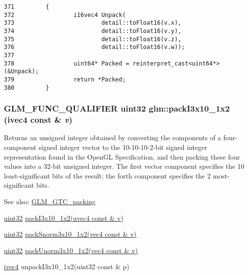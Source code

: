 \begin{Code}\begin{verbatim}371         {
372                 i16vec4 Unpack(
373                         detail::toFloat16(v.x),
374                         detail::toFloat16(v.y),
375                         detail::toFloat16(v.z),
376                         detail::toFloat16(v.w));
377 
378                 uint64* Packed = reinterpret_cast<uint64*>(&Unpack);
379                 return *Packed;
380         }
\end{verbatim}
\end{Code}


\hypertarget{group__gtc__packing_g032e18fa5bc5b8f3897104aeb2f1e195}{
\subsubsection[packI3x10\_\-1x2]{\setlength{\rightskip}{0pt plus 5cm}GLM\_\-FUNC\_\-QUALIFIER uint32 glm::packI3x10\_\-1x2 (ivec4 const \& {\em v})}}
\label{group__gtc__packing_g032e18fa5bc5b8f3897104aeb2f1e195}


Returns an unsigned integer obtained by converting the components of a four-component signed integer vector to the 10-10-10-2-bit signed integer representation found in the OpenGL Specification, and then packing these four values into a 32-bit unsigned integer. The first vector component specifies the 10 least-significant bits of the result; the forth component specifies the 2 most-significant bits.

\begin{Desc}
\item[See also:]\hyperlink{group__gtc__packing}{GLM\_\-GTC\_\-packing} 

\hyperlink{group__gtc__type__precision_g202b6a53c105fcb7e531f9b443518451}{uint32} \hyperlink{group__gtc__packing_g032e18fa5bc5b8f3897104aeb2f1e195}{packI3x10\_\-1x2(uvec4 const \& v)} 

\hyperlink{group__gtc__type__precision_g202b6a53c105fcb7e531f9b443518451}{uint32} \hyperlink{group__gtc__packing_g0d4157cec37c0312216a7be1cc92df54}{packSnorm3x10\_\-1x2(vec4 const \& v)} 

\hyperlink{group__gtc__type__precision_g202b6a53c105fcb7e531f9b443518451}{uint32} \hyperlink{group__gtc__packing_g2cf2d11b40bd48639110456fd74c2e33}{packUnorm3x10\_\-1x2(vec4 const \& v)} 

\hyperlink{group__core__types_ga4560ddc50320ea8f8a70d5c9c249fea}{ivec4} unpackI3x10\_\-1x2(uint32 const \& p) \end{Desc}


